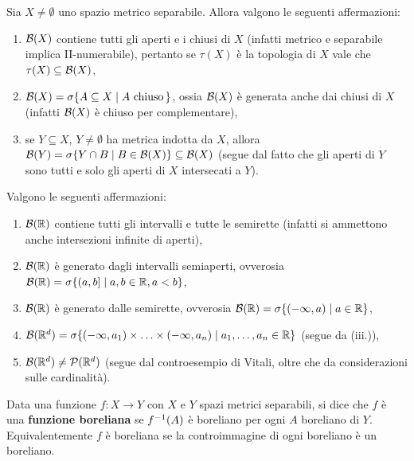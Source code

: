 \begin{multicols*}{2}
\begin{proposition}[Proprietà di $\BB(X)$]
    Sia $X \neq \emptyset$ uno spazio metrico separabile. Allora valgono
    le seguenti affermazioni:

    \begin{enumerate}[(i.)]
        \item $\BB(X)$ contiene tutti gli aperti e i chiusi di $X$ (infatti
        metrico e separabile implica II-numerabile), pertanto se $\tau(X)$ è la
        topologia di $X$ vale che $\tau(X) \subseteq \mathcal{B}(X)$,
        \item $\mathcal{B}(X) = \sigma \{ A \subseteq X \mid A \text{ chiuso}\, \}$, ossia
        $\BB(X)$ è generata anche dai chiusi di $X$ (infatti $\BB(X)$ è chiuso per
        complementare),
        \item se $Y \subseteq X$, $Y \neq \emptyset$ ha metrica indotta da $X$, allora
        $\mathcal{B}(Y) = \sigma \{ Y \cap B \mid B \in \mathcal{B}(X) \} \subseteq \mathcal{B}(X)$ (segue dal fatto che
        gli aperti di $Y$ sono tutti e solo gli aperti di $X$ intersecati a $Y$).
    \end{enumerate}
\end{proposition}

\begin{proposition}[Proprietà di $\BB(\RR^d)$]
    Valgono le seguenti affermazioni:
    \begin{enumerate}[(i.)]
        \item $\mathcal{B}(\mathbb{R})$ contiene tutti gli intervalli e tutte le semirette (infatti si ammettono anche intersezioni infinite di aperti),
        \item $\mathcal{B}(\mathbb{R})$ è generato dagli intervalli semiaperti, ovverosia $\mathcal{B}(\mathbb{R}) = \sigma \{ (a, b] \mid a, b \in \mathbb{R}, a < b \}$,
        \item $\mathcal{B}(\mathbb{R})$ è generato dalle semirette, ovverosia $\mathcal{B}(\mathbb{R}) = \sigma \{ (-\infty, a) \mid a \in \mathbb{R} \}$,
        \item $\mathcal{B}(\mathbb{R}^d) = \sigma \{ (-\infty, a_1) \times \ldots \times (-\infty, a_n) \mid a_1, \ldots, a_n \in \mathbb{R} \}$ (segue da (iii.)),
        \item $\mathcal{B}(\mathbb{R}^d) \neq \mathcal{P}(\mathbb{R}^d)$ (segue dal controesempio di Vitali, oltre che da considerazioni sulle cardinalità).
    \end{enumerate}
\end{proposition}

\begin{definition}
    Data una funzione $f : X \to Y$ con $X$ e $Y$ spazi metrici separabili, si dice che
    $f$ è una \textbf{funzione boreliana} se $f^{-1}(A)$ è boreliano per ogni
    $A$ boreliano di $Y$. Equivalentemente $f$ è boreliana se la controimmagine di ogni
    boreliano è un boreliano. \smallskip



\end{definition}
\end{multicols*}
